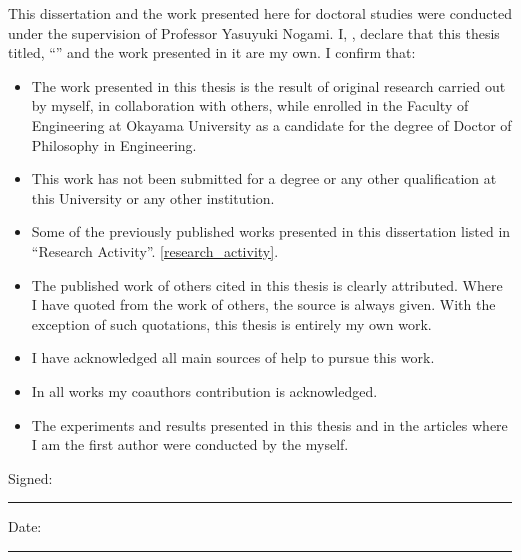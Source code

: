 \documentclass[
11pt, %
english, %
singlespacing, %
headsepline, %
]{MastersDoctoralThesis} %
\begin{document}

\begin{declaration}
	
\addchaptertocentry{\authorshipname} %
\noindent This dissertation and the work presented here for doctoral studies were conducted under the supervision of Professor Yasuyuki Nogami. 
 I, \authorname, declare that this thesis titled, \enquote{\ttitle} and the work presented in it are my own. I confirm that:

\begin{itemize} 
\item 
The work presented in this thesis is the result of original research carried out by myself, in collaboration with others, while enrolled in the Faculty of Engineering at Okayama University as a candidate for the degree of Doctor of Philosophy in Engineering.

\item This work has not been submitted for a degree or any other qualification at this University or any other institution. 
 
\item  Some of the previously published works presented in this dissertation listed in ``Research Activity''. \ref{research_activity}.

\item The published work of others cited in this thesis is clearly attributed.  Where I have quoted from the work of others, the source is always given. With the exception of such quotations, this thesis is entirely my own work.
\item I have acknowledged all main sources of help to pursue this work.
 \item In all works my coauthors contribution is acknowledged. 
 \item The experiments and results presented in this thesis and in the articles where I am the first author were conducted by the myself.\\
\end{itemize}
 
\noindent Signed:\\ 
\rule[0.5em]{25em}{0.5pt}
 
\noindent Date:\\
\rule[0.5em]{25em}{0.5pt} %
\end{declaration}
\end{document}
